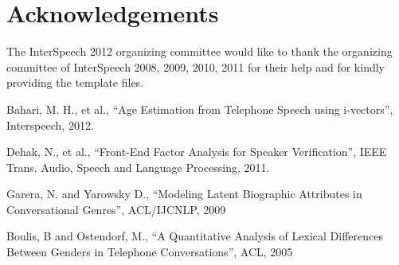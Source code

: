 \documentclass[a4paper]{article}
\begin{document}
\section{Acknowledgements}
The InterSpeech 2012 organizing committee would like to thank the organizing committee of InterSpeech 2008, 2009, 2010, 2011 for their help and for kindly providing the template files.

\eightpt

\begin{thebibliography}{10}
 Bahari, M. H., et al., 
``Age Estimation from Telephone Speech using i-vectors'', 
Interspeech, 2012.

 Dehak, N., et al., 
``Front-End Factor Analysis for Speaker Verification'', 
IEEE Trans. Audio, Speech and Language Processing, 2011.

 Garera, N. and Yarowsky D.,
``Modeling Latent Biographic Attributes in Conversational Genres'',
ACL/IJCNLP, 2009

 Boulis, B and Ostendorf, M.,
``A Quantitative Analysis of Lexical Differences Between Genders in Telephone Conversations'',
ACL, 2005

\end{thebibliography}
\end{document}
